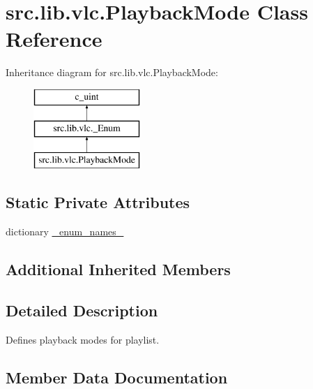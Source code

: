 \hypertarget{classsrc_1_1lib_1_1vlc_1_1PlaybackMode}{}\section{src.\+lib.\+vlc.\+Playback\+Mode Class Reference}
\label{classsrc_1_1lib_1_1vlc_1_1PlaybackMode}
Inheritance diagram for src.\+lib.\+vlc.\+Playback\+Mode\+:\begin{figure}[H]
\begin{center}
\leavevmode
\includegraphics[height=3.000000cm]{classsrc_1_1lib_1_1vlc_1_1PlaybackMode}
\end{center}
\end{figure}
\subsection*{Static Private Attributes}
\begin{DoxyCompactItemize}
\item 
dictionary \hyperlink{classsrc_1_1lib_1_1vlc_1_1PlaybackMode_a0cd4cf4af9191357f19a9d0fb1246d06}{\+\_\+enum\+\_\+names\+\_\+}
\end{DoxyCompactItemize}
\subsection*{Additional Inherited Members}


\subsection{Detailed Description}
\begin{DoxyVerb}Defines playback modes for playlist.
\end{DoxyVerb}
 

\subsection{Member Data Documentation}
\hypertarget{classsrc_1_1lib_1_1vlc_1_1PlaybackMode_a0cd4cf4af9191357f19a9d0fb1246d06}{}
